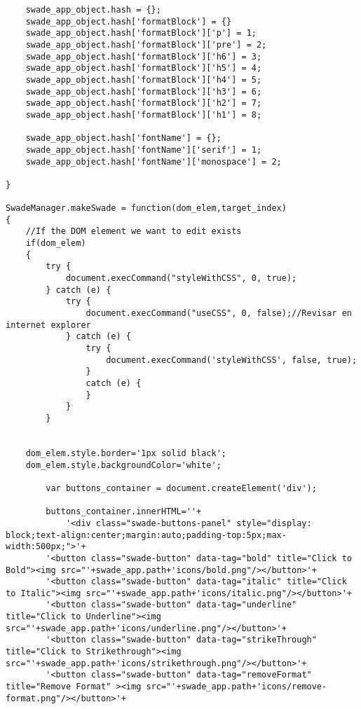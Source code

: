\begin{lstlisting}
    swade_app_object.hash = {};
    swade_app_object.hash['formatBlock'] = {}
    swade_app_object.hash['formatBlock']['p'] = 1; 
    swade_app_object.hash['formatBlock']['pre'] = 2;
    swade_app_object.hash['formatBlock']['h6'] = 3; 
    swade_app_object.hash['formatBlock']['h5'] = 4;
    swade_app_object.hash['formatBlock']['h4'] = 5;
    swade_app_object.hash['formatBlock']['h3'] = 6;
    swade_app_object.hash['formatBlock']['h2'] = 7;
    swade_app_object.hash['formatBlock']['h1'] = 8;

    swade_app_object.hash['fontName'] = {};
    swade_app_object.hash['fontName']['serif'] = 1;
    swade_app_object.hash['fontName']['monospace'] = 2;

}

SwadeManager.makeSwade = function(dom_elem,target_index)
{
    //If the DOM element we want to edit exists
    if(dom_elem)
    {
        try {
            document.execCommand("styleWithCSS", 0, true);
        } catch (e) {
            try {
                document.execCommand("useCSS", 0, false);//Revisar en internet explorer
            } catch (e) {
                try {
                    document.execCommand('styleWithCSS', false, true);
                }
                catch (e) {
                }
            }
        }


	dom_elem.style.border='1px solid black';
	dom_elem.style.backgroundColor='white';

        var buttons_container = document.createElement('div');

        buttons_container.innerHTML=''+
            '<div class="swade-buttons-panel" style="display: block;text-align:center;margin:auto;padding-top:5px;max-width:500px;">'+
	    '<button class="swade-button" data-tag="bold" title="Click to Bold"><img src="'+swade_app.path+'icons/bold.png"/></button>'+
	    '<button class="swade-button" data-tag="italic" title="Click to Italic"><img src="'+swade_app.path+'icons/italic.png"/></button>'+
	    '<button class="swade-button" data-tag="underline" title="Click to Underline"><img src="'+swade_app.path+'icons/underline.png"/></button>'+
	    '<button class="swade-button" data-tag="strikeThrough" title="Click to Strikethrough"><img src="'+swade_app.path+'icons/strikethrough.png"/></button>'+
	    '<button class="swade-button" data-tag="removeFormat" title="Remove Format" ><img src="'+swade_app.path+'icons/remove-format.png"/></button>'+
	    

\end{lstlisting}
